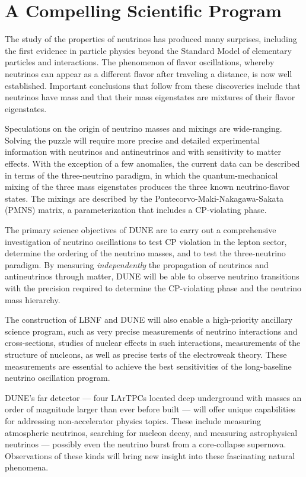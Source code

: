 \section{A Compelling Scientific Program}

The study of the properties of neutrinos has produced %
many surprises, including the first evidence in particle physics beyond the Standard Model of elementary particles and interactions.   The phenomenon of flavor oscillations, whereby neutrinos can 
appear as a different flavor after traveling a distance, %
is now well established. Important conclusions that follow from these discoveries include that neutrinos have mass and that their %
mass eigenstates are mixtures of their %
flavor eigenstates.

Speculations on the origin of neutrino masses and mixings are wide-ranging. 
Solving the puzzle will require more precise and detailed experimental information with neutrinos and antineutrinos and with sensitivity to matter effects. With the exception of a few anomalies, the current data can be described in terms of the three-neutrino paradigm, in which the 
quantum-mechanical mixing of the three mass eigenstates produces the three known neutrino-flavor states.  The mixings are described by the Pontecorvo-Maki-Nakagawa-Sakata (PMNS) matrix, a parameterization that includes a CP-violating phase. 

The primary science objectives %
of DUNE are to carry out a comprehensive investigation of neutrino oscillations to test CP violation in the lepton sector, determine the ordering of the neutrino masses, and to test the three-neutrino paradigm.
By measuring \textit{independently} the  propagation of neutrinos and antineutrinos through matter, DUNE will be able to observe %
neutrino transitions with the precision required to determine the 
CP-violating phase and %
the neutrino mass hierarchy.

The construction of LBNF and DUNE will also enable a high-priority ancillary science program, such as 
very precise measurements of neutrino interactions and cross-sections, studies of nuclear effects in such interactions, measurements of the structure of nucleons, as well as precise tests of the electroweak theory. 
These measurements are essential to achieve the best sensitivities of the long-baseline neutrino oscillation program. %

DUNE's far detector --- four LArTPCs located deep underground with masses an order of magnitude larger than ever before built  ---  %
will offer unique capabilities for addressing %
non-accelerator physics topics. These include measuring atmospheric neutrinos, searching for nucleon decay, and measuring astrophysical neutrinos --- possibly even %
the neutrino burst %
from a core-collapse supernova. 
Observations of these kinds will bring new insight into these fascinating natural phenomena. 

